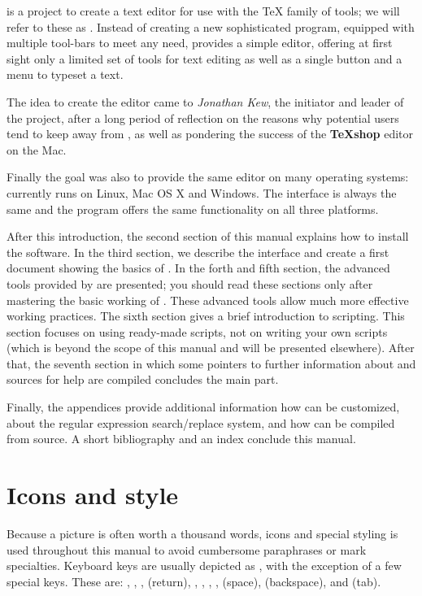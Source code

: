 \textbf{\Tw} is a project to create a text editor for use with the {\TeX} family of tools; we will refer to these as \AllTeX. Instead of creating a new sophisticated program, equipped with multiple tool-bars to meet any need, {\Tw} provides a simple editor, offering at first sight only a limited set of tools for text editing as well as a single button and a menu to typeset a {\AllTeX} text.

The idea to create the editor came to \emph{Jonathan Kew}, the initiator and leader of the project, after a long period of reflection on the reasons why potential users tend to keep away from \AllTeX, as well as pondering the success of the \textbf{{\TeX}shop} editor on the Mac.

Finally the goal was also to provide the same editor on many operating systems: {\Tw} currently runs on Linux, Mac OS X and Windows. The interface is always the same and the program offers the same functionality on all three platforms.

After this introduction, the second section of this manual explains how to install the software. In the third section, we describe the interface and create a first document showing the basics of {\Tw}. In the forth and fifth section, the advanced tools provided by {\Tw} are presented; you should read these sections only after mastering the basic working of {\Tw}. These advanced tools allow much more effective working practices. The sixth section gives a brief introduction to scripting. This section focuses on using ready-made scripts, not on writing your own scripts (which is beyond the scope of this manual and will be presented elsewhere). After that, the seventh section in which some pointers to further information about {\Tw} and sources for help are compiled concludes the main part.

Finally, the appendices provide additional information how {\Tw} can be customized, about the regular expression search/replace system, and how {\Tw} can be compiled from source. A short bibliography and an index conclude this manual.

\section{Icons and style}

Because a picture is often worth a thousand words, icons and special styling is used throughout this manual to avoid cumbersome paraphrases or mark specialties. Keyboard keys are usually depicted as , with the exception of a few special keys. These are:
, , ,  (return), , , , ,  (space),  (backspace), and  (tab).

